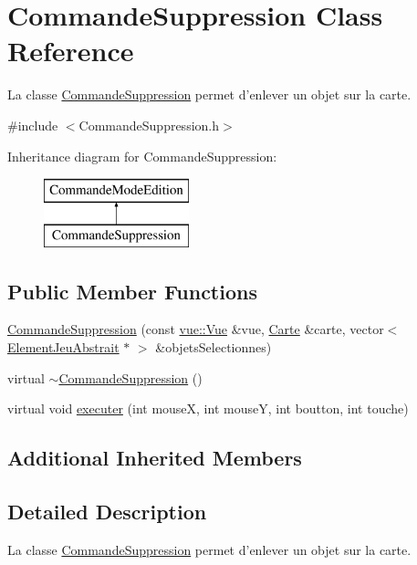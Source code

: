 \hypertarget{class_commande_suppression}{\section{Commande\-Suppression Class Reference}
\label{class_commande_suppression}
}


La classe \hyperlink{class_commande_suppression}{Commande\-Suppression} permet d'enlever un objet sur la carte.  




{\ttfamily \#include $<$Commande\-Suppression.\-h$>$}

Inheritance diagram for Commande\-Suppression\-:\begin{figure}[H]
\begin{center}
\leavevmode
\includegraphics[height=2.000000cm]{class_commande_suppression}
\end{center}
\end{figure}
\subsection*{Public Member Functions}
\begin{DoxyCompactItemize}
\item 
\hyperlink{class_commande_suppression_a6438eb61f3a3971c3e23f8d4e2d7628f}{Commande\-Suppression} (const \hyperlink{classvue_1_1_vue}{vue\-::\-Vue} \&vue, \hyperlink{class_carte}{Carte} \&carte, vector$<$ \hyperlink{class_element_jeu_abstrait}{Element\-Jeu\-Abstrait} $\ast$ $>$ \&objets\-Selectionnes)
\item 
virtual \hyperlink{class_commande_suppression_a8a8c9487c2f267bf008ef98dec1d808e}{$\sim$\-Commande\-Suppression} ()
\item 
virtual void \hyperlink{class_commande_suppression_a8e3947cc0dcdcb85348e5c873f6def44}{executer} (int mouse\-X, int mouse\-Y, int boutton, int touche)
\end{DoxyCompactItemize}
\subsection*{Additional Inherited Members}


\subsection{Detailed Description}
La classe \hyperlink{class_commande_suppression}{Commande\-Suppression} permet d'enlever un objet sur la carte. 

